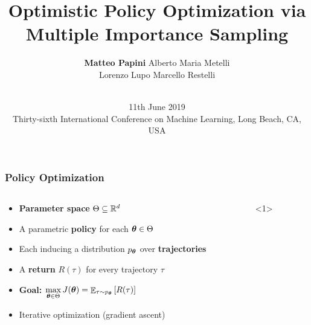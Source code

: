\documentclass[aspectratio=169, table]{beamer}
\title{Optimistic Policy Optimization via Multiple Importance Sampling}
\date[AAA]{\vspace{0.2cm} \\ \small{ 11th June 2019 \\ Thirty-sixth International Conference on Machine Learning, Long Beach, CA, {USA}}}
\author[M. Papini]{\textbf{Matteo Papini} \quad Alberto Maria Metelli\\
						\small{Lorenzo Lupo \quad Marcello Restelli}}
\newcommand{\enb}[1]{\textcolor{poliblue1}{\textbf{#1}}}
\begin{document}

\begin{frame}
\titlepage
\end{frame}

\begin{frame}[noframenumbering]
\frametitle{Policy Optimization} 
\begin{columns}
\begin{column}{.65\textwidth}
\begin{itemize}
	\item \enb{Parameter space} $\Theta \subseteq \mathbb{R}^d$
	\item<2-> A parametric \enb{policy} for each $\boldsymbol{\theta}\in\Theta$
	\item<3-> Each inducing a distribution $p_{\boldsymbol{\theta}}$ over \enb{trajectories}
	\item<4-> A \enb{return} $R(\tau)$ for every trajectory $\tau$
	\item<5-> {\enb{Goal:} $\max\limits_{\boldsymbol{\theta}\in\Theta} J(\boldsymbol{\theta}) = \mathop{\mathbb{E}}_{\tau\sim p_{\boldsymbol{\theta}}}\left[R(\tau)\right]$}
	\item<6-> Iterative optimization (\eg gradient ascent)
\end{itemize}
\end{column}
\begin{column}{.35\textwidth}
	\only{
}
\end{column}
\end{columns}
\end{frame}
\end{document}
